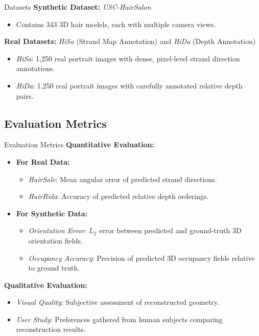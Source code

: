 \begin{frame}[t]{Datasets}
    \textbf{Synthetic Dataset:} \emph{USC-HairSalon}~\cite{Hu2015SingleviewHM}
    \begin{itemize}
        \item Contains 343 3D hair models, each with multiple camera views.
    \end{itemize}

    \vspace{5pt}
    \textbf{Real Datasets:} \emph{HiSa} (Strand Map Annotation) and \emph{HiDa} (Depth Annotation)
    \begin{itemize}
        \item \emph{HiSa}: 1,250 real portrait images with dense, pixel-level strand direction annotations.
        \item \emph{HiDa}: 1,250 real portrait images with carefully annotated relative depth pairs.
    \end{itemize}
\end{frame}

\subsection{Evaluation Metrics}

\begin{frame}[t]{Evaluation Metrics}
    \textbf{Quantitative Evaluation:}
    \begin{itemize}
        \item \textbf{For Real Data:}
        \begin{itemize}
            \item \emph{HairSale}: Mean angular error of predicted strand directions.
            \item \emph{HairRida}: Accuracy of predicted relative depth orderings.
        \end{itemize}
        \item \textbf{For Synthetic Data:}
        \begin{itemize}
            \item \emph{Orientation Error}: $L_2$ error between predicted and ground-truth 3D orientation fields.
            \item \emph{Occupancy Accuracy}: Precision of predicted 3D occupancy fields relative to ground truth.
        \end{itemize}
    \end{itemize}

    \vspace{5pt}
    \textbf{Qualitative Evaluation:}
    \begin{itemize}
        \item \emph{Visual Quality}: Subjective assessment of reconstructed geometry.
        \item \emph{User Study}: Preferences gathered from human subjects comparing reconstruction results.
    \end{itemize}
\end{frame}

